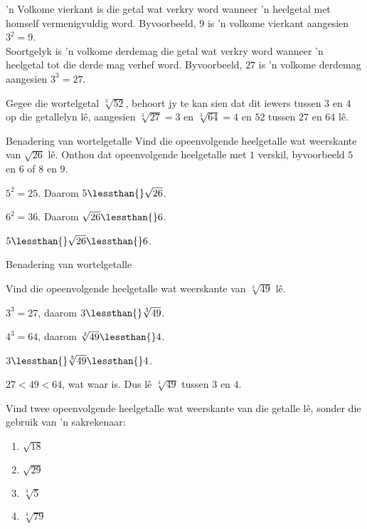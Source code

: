 ’n Volkome vierkant is die getal wat verkry word wanneer ’n heelgetal met homself vermenigvuldig word. Byvoorbeeld, $9$  is ’n volkome vierkant aangesien ${3}^{2}=9$. \\
Soortgelyk is ’n volkome derdemag die getal wat verkry word wanneer ’n heelgetal
tot die derde mag verhef word. Byvoorbeeld, $27$ is ’n volkome derdemag aangesien ${3}^{3}=27$.
\par 
Gegee die wortelgetal $\sqrt[3]{52}$, behoort jy te kan sien dat dit iewers tussen $3$ en $4$ op die getallelyn lê, aangesien $\sqrt[3]{27}=3$ en $\sqrt[3]{64}=4$ en $52$ tussen $27$ en $64$ lê.

\begin{wex}{Benadering van wortelgetalle}
{
Vind die opeenvolgende heelgetalle wat weerskante van $\sqrt{26}$ lê.
Onthou dat opeenvolgende heelgetalle met $1$ verskil, byvoorbeeld $5$ en $6$ of $8$ en $9$.
}
{
           
${5}^{2}=25$. Daarom $5\lessthan{}\sqrt{26}$.

${6}^{2}=36$. 
Daarom $\sqrt{26}\lessthan{}6$.

$5\lessthan{}\sqrt{26}\lessthan{}6$. 
}
\end{wex}


\begin{wex}{Benadering van wortelgetalle }{

Vind die opeenvolgende heelgetalle wat weerskante van $\sqrt[3]{49}$ lê.
}
{
   ${3}^{3}=27$, daarom $3\lessthan{}\sqrt[3]{49}$.

 ${4}^{3}=64$, daarom $\sqrt[3]{49}\lessthan{}4$. 

$3\lessthan{}\sqrt[3]{49}\lessthan{}4$.

$27<49<64$, wat waar is. Dus lê $\sqrt[3]{49}$ tussen $3$ en $4$.
}
\end{wex}

\begin{exercises}{}
 {
Vind twee opeenvolgende heelgetalle wat weerskante van die getalle lê, sonder die gebruik van 'n sakrekenaar:
\begin{enumerate}[itemsep=5pt, label=\textbf{\arabic*}. ]
\item $\sqrt{18}$
\item $\sqrt{29}$
\item $\sqrt[3]{5}$
\item $\sqrt[3]{79}$

\end{enumerate}
}
\end{exercises}




